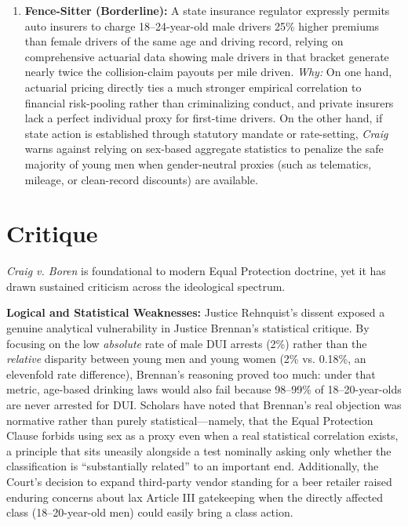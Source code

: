 \documentclass[12pt]{article}
\begin{document}
\begin{enumerate}
  \item \textbf{Fence-Sitter (Borderline):} A state insurance regulator expressly permits auto insurers to charge 18--24-year-old male drivers 25\% higher premiums than female drivers of the same age and driving record, relying on comprehensive actuarial data showing male drivers in that bracket generate nearly twice the collision-claim payouts per mile driven. \textit{Why:} On one hand, actuarial pricing directly ties a much stronger empirical correlation to financial risk-pooling rather than criminalizing conduct, and private insurers lack a perfect individual proxy for first-time drivers. On the other hand, if state action is established through statutory mandate or rate-setting, \textit{Craig} warns against relying on sex-based aggregate statistics to penalize the safe majority of young men when gender-neutral proxies (such as telematics, mileage, or clean-record discounts) are available.
\end{enumerate}

\section{Critique}

\textit{Craig v. Boren} is foundational to modern Equal Protection doctrine, yet it has drawn sustained criticism across the ideological spectrum.

\textbf{Logical and Statistical Weaknesses:} Justice Rehnquist's dissent exposed a genuine analytical vulnerability in Justice Brennan's statistical critique. By focusing on the low \textit{absolute} rate of male DUI arrests (2\%) rather than the \textit{relative} disparity between young men and young women (2\% vs. 0.18\%, an elevenfold rate difference), Brennan's reasoning proved too much: under that metric, age-based drinking laws would also fail because 98--99\% of 18--20-year-olds are never arrested for DUI. Scholars have noted that Brennan's real objection was normative rather than purely statistical---namely, that the Equal Protection Clause forbids using sex as a proxy even when a real statistical correlation exists, a principle that sits uneasily alongside a test nominally asking only whether the classification is ``substantially related'' to an important end. Additionally, the Court's decision to expand third-party vendor standing for a beer retailer raised enduring concerns about lax Article III gatekeeping when the directly affected class (18--20-year-old men) could easily bring a class action.
\end{document}
